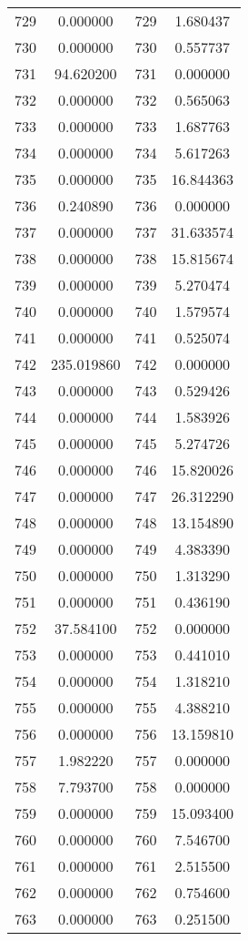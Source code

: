 \documentclass[12pt]{article}
\begin{document}
\begin{longtable}{@{}cccc@{}}
729 & 0.000000 & 729 & 1.680437 \\
730 & 0.000000 & 730 & 0.557737 \\
731 & 94.620200 & 731 & 0.000000 \\
732 & 0.000000 & 732 & 0.565063 \\
733 & 0.000000 & 733 & 1.687763 \\
734 & 0.000000 & 734 & 5.617263 \\
735 & 0.000000 & 735 & 16.844363 \\
736 & 0.240890 & 736 & 0.000000 \\
737 & 0.000000 & 737 & 31.633574 \\
738 & 0.000000 & 738 & 15.815674 \\
739 & 0.000000 & 739 & 5.270474 \\
740 & 0.000000 & 740 & 1.579574 \\
741 & 0.000000 & 741 & 0.525074 \\
742 & 235.019860 & 742 & 0.000000 \\
743 & 0.000000 & 743 & 0.529426 \\
744 & 0.000000 & 744 & 1.583926 \\
745 & 0.000000 & 745 & 5.274726 \\
746 & 0.000000 & 746 & 15.820026 \\
747 & 0.000000 & 747 & 26.312290 \\
748 & 0.000000 & 748 & 13.154890 \\
749 & 0.000000 & 749 & 4.383390 \\
750 & 0.000000 & 750 & 1.313290 \\
751 & 0.000000 & 751 & 0.436190 \\
752 & 37.584100 & 752 & 0.000000 \\
753 & 0.000000 & 753 & 0.441010 \\
754 & 0.000000 & 754 & 1.318210 \\
755 & 0.000000 & 755 & 4.388210 \\
756 & 0.000000 & 756 & 13.159810 \\
757 & 1.982220 & 757 & 0.000000 \\
758 & 7.793700 & 758 & 0.000000 \\
759 & 0.000000 & 759 & 15.093400 \\
760 & 0.000000 & 760 & 7.546700 \\
761 & 0.000000 & 761 & 2.515500 \\
762 & 0.000000 & 762 & 0.754600 \\
763 & 0.000000 & 763 & 0.251500 \\

\end{longtable}
\end{document}
